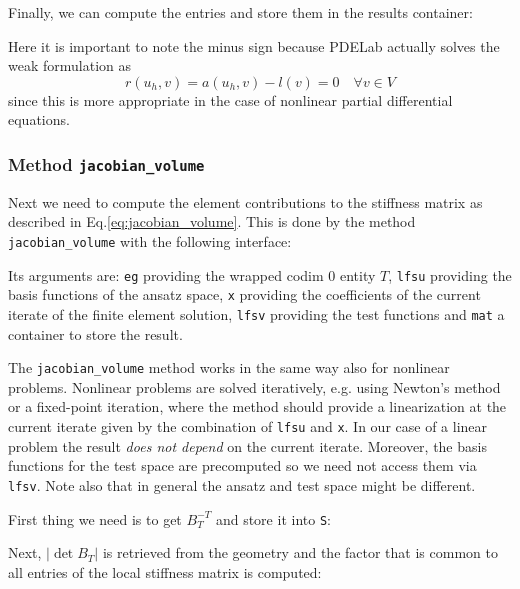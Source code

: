 \documentclass[a4paper,12pt]{article}
\begin{document}
Finally, we can compute the entries and store them in the results container:

Here it is important to note the minus sign because PDELab
actually solves the weak formulation as 
$$r(u_h,v) = a(u_h,v)-l(v) = 0 \quad \forall v\in V$$
since this is more appropriate in the case of nonlinear partial
differential equations.

\subsubsection*{Method \lstinline{jacobian_volume}}

Next we need to compute the element contributions to the 
stiffness matrix as described in Eq.\eqref{eq:jacobian_volume}.
This is done by the method \lstinline{jacobian_volume} with
the following interface:

Its arguments are: \lstinline{eg} providing the wrapped codim 0 entity $T$,
\lstinline{lfsu} providing the basis functions of the ansatz space,
\lstinline{x} providing the coefficients of the current iterate 
of the finite element solution, \lstinline{lfsv} providing the test functions
and \lstinline{mat} a container to store the result.

The \lstinline{jacobian_volume} method works in the same way also for nonlinear
problems. Nonlinear problems are solved iteratively, e.g. using Newton's method
or a fixed-point iteration, where the method should provide a linearization
at the current iterate given by the combination of \lstinline{lfsu} and \lstinline{x}.
In our case of a linear problem the result {\em does not depend} on the current iterate.
Moreover, the basis functions for the test space are precomputed so we need
not access them via \lstinline{lfsv}. Note also that in general the ansatz and
test space might be different.

First thing we need is to get $B_T^{-T}$ and store it into \lstinline{S}:


Next, $|\det B_T|$ is retrieved from the geometry and
the factor that is common to all entries of the local stiffness matrix is computed:

\end{document}
